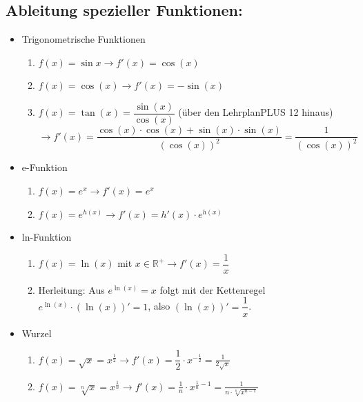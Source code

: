 \subsection{Ableitung spezieller Funktionen:}
\begin{itemize}
\item Trigonometrische Funktionen\\
\begin{enumerate} \item $f(x)= \sin{x} \longrightarrow f'(x) = \cos(x)$\\
\item $f(x)= \cos(x) \longrightarrow f'(x) = -\sin(x)$\\
\item $f(x) = \tan(x)= \dfrac{\sin(x)}{\cos(x)}$ (über den LehrplanPLUS 12 hinaus) \\$ \longrightarrow f'(x) = \dfrac{\cos(x) \cdot \cos(x) + \sin(x) \cdot \sin(x)}{(\cos(x))^2} = \dfrac{1}{(\cos(x))^2}$
\end{enumerate}
\item e-Funktion\\ \begin{enumerate} \item $f(x) = e^x \longrightarrow f'(x) = e^x$ \\ \item $f(x) = e^{h(x) } \longrightarrow f'(x) = h'(x) \cdot e^{h(x)}$\end{enumerate}
\item ln-Funktion\\ \begin{enumerate} \item $f(x) = \ln(x)$ mit $x\in \mathds{R}^+ \longrightarrow f'(x) = \dfrac{1}{x}$\\ \item Herleitung: Aus $e^{\ln(x)} = x$ folgt mit der Kettenregel $e^{\ln(x)}\cdot (\ln(x))' = 1$, also $(\ln(x))' = \dfrac{1}{x}$. \end{enumerate}
\item Wurzel\\ \begin{enumerate}\item $f(x) = \sqrt{x} = x^{\frac{1}{2}} \longrightarrow f'(x) = \dfrac{1}{2} \cdot x^{-\frac{1}{2}} = \frac{1}{2\sqrt{x}}$\\ \item $f(x)= \sqrt[n]{x} = x^{\frac{1}{n}} \longrightarrow f'(x) = \frac{1}{n} \cdot x^{\frac{1}{n} -1} = \frac{1}{n\cdot \sqrt[n]{x^{n-1}}}$\end{enumerate}
\end{itemize}
